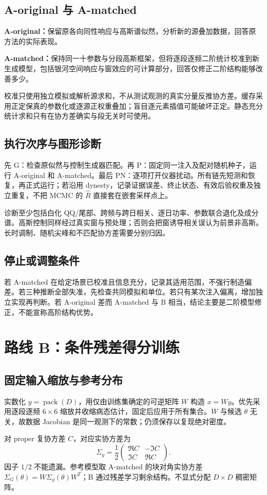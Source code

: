\documentclass[UTF8,fontset=none,a4paper,11pt]{ctexart}
\newcommand{\chapterpage}[1]{\section{#1}}
\begin{document}
\subsection{A-original 与 A-matched}
\textbf{A-original：}保留原各向同性响应与高斯谱似然，分析新的源叠加数据，回答原方法的实际表现。\par
\textbf{A-matched：}保持同一十参数与分段高斯框架，但将逐段逐频二阶统计校准到新生成模型，包括银河空间响应与窗效应的可计算部分，回答仅修正二阶结构能够改善多少。
\par 校准只使用独立模拟或解析源求和，不从测试观测的真实分量反推协方差。缓存采用正定保真的参数化或逐源正权重叠加；盲目逐元素插值可能破坏正定。静态充分统计求和只有在协方差确实与段无关时可使用。
\subsection{执行次序与图形诊断}
先 G：检查原似然与控制生成器匹配。再 P：固定同一注入及配对随机种子，运行 A-original 和 A-matched。最后 PN：逐项打开仪器扰动。所有链先短测和恢复，再正式运行；若沿用 dynesty，记录证据误差、终止状态、有效后验权重及独立重复，不把 MCMC 的 $\widehat R$ 直接套在嵌套采样点上。
\par 诊断至少包括白化 QQ/尾部、跨频与跨日相关、逐日功率、参数联合退化及成分谱。高斯控制同样经过真实窗与预处理；否则会把窗诱导相关误认为前景非高斯。长时调制、随机尖峰和不匹配协方差需要分别归因。
\subsection{停止或调整条件}
若 A-matched 在给定场景已校准且信息充分，记录其适用范围，不强行制造偏差。若三种推断全部失准，先检查共同模拟和单位。若只有某次注入偏离，增加独立实现再判断。若 A-original 差而 A-matched 与 B 相当，结论主要是二阶模型修正，不能宣称高阶结构优势。
\chapterpage{路线 B：条件残差得分训练}
\subsection{固定输入缩放与参考分布}
实数化 $y=\operatorname{pack}(D)$，用仅由训练集确定的可逆矩阵 $W$ 构造 $x=Wy$。优先采用逐段逐频 $6\times6$ 缩放并收缩病态估计，固定后应用于所有集合。$W$ 与候选 $\theta$ 无关，故数据 Jacobian 是同一观测下的常数；仍须保存以复现绝对密度。
\par 对 proper 复协方差 $C$，对应实协方差为
\begin{equation}
\Sigma_y=\frac12\begin{pmatrix}\Re C&-\Im C\\\Im C&\Re C\end{pmatrix}.
\end{equation}
因子 $1/2$ 不能遗漏。参考模型取 A-matched 的块对角实协方差 $\Sigma_G(\theta)=W\Sigma_y(\theta)W^T$；B 通过残差学习剩余结构。不显式分配 $D\times D$ 稠密矩阵。
\end{document}
